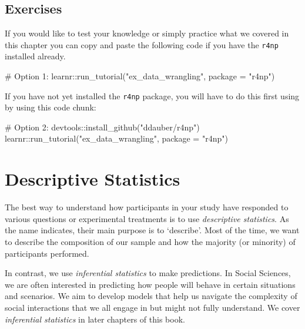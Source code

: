 \documentclass[
  letterpaper,
]{krantz}
\makeatletter
\newenvironment{Shaded}{\begin{snugshade}}{\end{snugshade}}
\newcommand{\AttributeTok}[1]{\textcolor[rgb]{0.40,0.45,0.13}{#1}}
\newcommand{\CommentTok}[1]{\textcolor[rgb]{0.37,0.37,0.37}{#1}}
\newcommand{\FunctionTok}[1]{\textcolor[rgb]{0.28,0.35,0.67}{#1}}
\newcommand{\NormalTok}[1]{\textcolor[rgb]{0.00,0.23,0.31}{#1}}
\newcommand{\SpecialCharTok}[1]{\textcolor[rgb]{0.37,0.37,0.37}{#1}}
\newcommand{\StringTok}[1]{\textcolor[rgb]{0.13,0.47,0.30}{#1}}
\newenvironment{kframe}{%
\medskip{}
\setlength{\fboxsep}{.8em}
 \def\at@end@of@kframe{}%
 \ifinner\ifhmode%
  \def\at@end@of@kframe{\end{minipage}}%
  \begin{minipage}{\columnwidth}%
 \fi\fi%
 \def\FrameCommand##1{\hskip\@totalleftmargin \hskip-\fboxsep
 \colorbox{shadecolor}{##1}\hskip-\fboxsep
     \hskip-\linewidth \hskip-\@totalleftmargin \hskip\columnwidth}%
 \MakeFramed {\advance\hsize-\width
   \@totalleftmargin\z@ \linewidth\hsize
   \@setminipage}}%
 {\par\unskip\endMakeFramed%
 \at@end@of@kframe}
\renewenvironment{Shaded}{\begin{kframe}}{\end{kframe}}
\makeatother
\begin{document}
\section{Exercises}\label{exercises}

If you would like to test your knowledge or simply practice what we
covered in this chapter you can copy and paste the following code if you
have the \texttt{r4np} installed already.

\begin{Shaded}
\begin{Highlighting}[]
\CommentTok{\# Option 1:}
\NormalTok{learnr}\SpecialCharTok{::}\FunctionTok{run\_tutorial}\NormalTok{(}\StringTok{"ex\_data\_wrangling"}\NormalTok{, }\AttributeTok{package =} \StringTok{"r4np"}\NormalTok{)}
\end{Highlighting}
\end{Shaded}

If you have not yet installed the \texttt{r4np} package, you will have
to do this first using by using this code chunk:

\begin{Shaded}
\begin{Highlighting}[]
\CommentTok{\# Option 2:}
\NormalTok{devtools}\SpecialCharTok{::}\FunctionTok{install\_github}\NormalTok{(}\StringTok{"ddauber/r4np"}\NormalTok{)}
\NormalTok{learnr}\SpecialCharTok{::}\FunctionTok{run\_tutorial}\NormalTok{(}\StringTok{"ex\_data\_wrangling"}\NormalTok{, }\AttributeTok{package =} \StringTok{"r4np"}\NormalTok{)}
\end{Highlighting}
\end{Shaded}


\chapter{Descriptive Statistics}\label{descriptive-statistics}

The best way to understand how participants in your study have responded
to various questions or experimental treatments is to use
\emph{descriptive statistics}. As the name indicates, their main purpose
is to `describe'. Most of the time, we want to describe the composition
of our sample and how the majority (or minority) of participants
performed.

In contrast, we use \emph{inferential statistics} to make predictions.
In Social Sciences, we are often interested in predicting how people
will behave in certain situations and scenarios. We aim to develop
models that help us navigate the complexity of social interactions that
we all engage in but might not fully understand. We cover
\emph{inferential statistics} in later chapters of this book.
\end{document}
